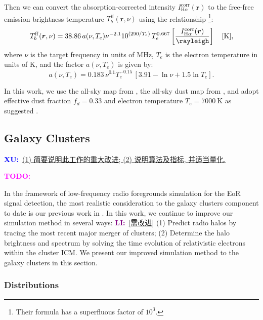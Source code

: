 \documentclass[modern]{aastex61}
\newcommand{\R}[1]{\mathrm{#1}}
\newcommand{\Halpha}{\text{H$\alpha$}}
\newcommand{\TODO}[1]{\textcolor{magenta}{\textbf{TODO:}}~\uuline{#1}}
\newcommand{\XU}[1]{\textcolor{blue}{\textbf{XU:}}~\uline{#1}}
\newcommand{\LI}[1]{\textcolor{purple}{\textbf{LI:}}~\uline{#1}}
\begin{document}
Then we can convert the absorption-corrected \Halpha{} intensity
$I_{\Halpha}^{\R{corr}}(\bm{r})$ to the free-free emission brightness
temperature $T_b^{\R{ff}}(\bm{r}, \nu)$
using the relationship \citep{dickinson2003}
\footnote{Their formula has a superfluous factor of $10^3$.}:
\begin{equation}
  \label{eq:halpha-ff}
  T_b^{\R{ff}}(\bm{r}, \nu) = 38.86 \, a(\nu, T_e) \nu^{-2.1}
    10^{(290 / T_e)} \, T_e^{0.667}
    \left[ \frac{I_{\Halpha}^{\R{corr}}(\bm{r})}{\si{\rayleigh}} \right]
    \quad [\si{\kelvin}],
\end{equation}
where $\nu$ is the target frequency in units of \si{\MHz},
$T_e$ is the electron temperature in units of \si{\kelvin},
and the factor $a(\nu, T_e)$ is given by:
\begin{equation}
  a(\nu, T_e) = 0.183 \,\nu^{0.1} T_e^{-0.15}
    \, [ 3.91 - \ln \nu + 1.5 \ln T_e ].
\end{equation}

In this work, we use the all-sky \Halpha{} map from \citet{finkbeiner2003},
the all-sky dust map from \citet{schlegel1998}, and
adopt effective dust fraction $f_d = 0.33$ and
electron temperature $T_e = \SI{7000}{\kelvin}$
as suggested \citep{dickinson2003}.


\subsection{Galaxy Clusters}
\label{sec:fg-clusters}

\XU{(1) 简要说明此工作的重大改进; (2) 说明算法及指标, 并适当量化.}

\TODO{Rewrite this overview!!!}

In the framework of low-frequency radio foregrounds simulation for the
EoR signal detection, the most realistic consideration to the galaxy
clusters component to date is our previous work in \citeyear{wang2010}
\citep{wang2010}.
In this work, we continue to improve our simulation method in several
ways: \LI{[需改进]}
(1) Predict radio halos by tracing the most recent major merger of clusters;
(2) Determine the halo brightness and spectrum by solving the time
evolution of relativistic electrons within the cluster ICM.
We present our improved simulation method to the galaxy clusters in this
section.


\subsubsection{Distributions}
\label{sec:distributions}
\end{document}

